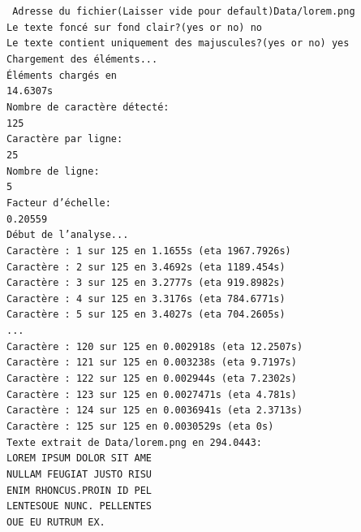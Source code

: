 \documentclass[a4paper,12pt,titlepage]{report}
\begin{document}
	\texttt{
	Adresse du fichier(Laisser vide pour default)Data/lorem.png\\
Le texte foncé sur fond clair?(yes or no) no\\
Le texte contient uniquement des majuscules?(yes or no) yes\\
Chargement des éléments...\\
Éléments chargés en \\
14.6307s\\
Nombre de caractère détecté:\\
 125\\
Caractère par ligne:\\
 25\\
Nombre de ligne:\\
 5\\
Facteur d'échelle:\\
 0.20559\\
Début de l'analyse...\\
Caractère : 1 sur 125 en 1.1655s (eta 1967.7926s)\\
Caractère : 2 sur 125 en 3.4692s (eta 1189.454s)\\
Caractère : 3 sur 125 en 3.2777s (eta 919.8982s)\\
Caractère : 4 sur 125 en 3.3176s (eta 784.6771s)\\
Caractère : 5 sur 125 en 3.4027s (eta 704.2605s)\\
	...\\
Caractère : 120 sur 125 en 0.002918s (eta 12.2507s)\\
Caractère : 121 sur 125 en 0.003238s (eta 9.7197s)\\
Caractère : 122 sur 125 en 0.002944s (eta 7.2302s)\\
Caractère : 123 sur 125 en 0.0027471s (eta 4.781s)\\
Caractère : 124 sur 125 en 0.0036941s (eta 2.3713s)\\
Caractère : 125 sur 125 en 0.0030529s (eta 0s)\\
Texte extrait de Data/lorem.png en 294.0443:\\
LOREM IPSUM DOLOR SIT AME\\
NULLAM FEUGIAT JUSTO RISU\\
ENIM RHONCUS.PROIN ID PEL\\
LENTESOUE NUNC. PELLENTES\\
OUE EU RUTRUM EX.\\}
\end{document}

